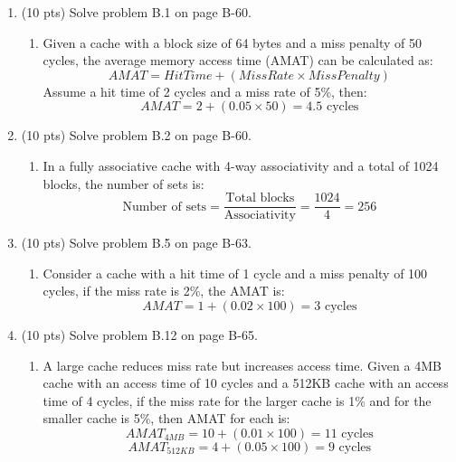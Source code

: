 \begin{enumerate}
    \item (10 pts) Solve problem B.1 on page B-60.
    \begin{enumerate}
        \item Given a cache with a block size of 64 bytes and a miss penalty of 50 cycles, the average memory access time (AMAT) can be calculated as:
        \begin{equation}
        AMAT = Hit Time + (Miss Rate \times Miss Penalty)
        \end{equation}
        Assume a hit time of 2 cycles and a miss rate of 5\%, then:
        \begin{equation}
        AMAT = 2 + (0.05 \times 50) = 4.5 \text{ cycles}
        \end{equation}
    \end{enumerate}
    
    \item (10 pts) Solve problem B.2 on page B-60.
    \begin{enumerate}
        \item In a fully associative cache with 4-way associativity and a total of 1024 blocks, the number of sets is:
        \begin{equation}
        \text{Number of sets} = \frac{\text{Total blocks}}{\text{Associativity}} = \frac{1024}{4} = 256
        \end{equation}
    \end{enumerate}
    
    \item (10 pts) Solve problem B.5 on page B-63.
    \begin{enumerate}
        \item Consider a cache with a hit time of 1 cycle and a miss penalty of 100 cycles, if the miss rate is 2\%, the AMAT is:
        \begin{equation}
        AMAT = 1 + (0.02 \times 100) = 3 \text{ cycles}
        \end{equation}
    \end{enumerate}
    
    \item (10 pts) Solve problem B.12 on page B-65.
    \begin{enumerate}
        \item A large cache reduces miss rate but increases access time. Given a 4MB cache with an access time of 10 cycles and a 512KB cache with an access time of 4 cycles, if the miss rate for the larger cache is 1\% and for the smaller cache is 5\%, then AMAT for each is:
        \begin{equation}
        AMAT_{4MB} = 10 + (0.01 \times 100) = 11 \text{ cycles}
        \end{equation}
        \begin{equation}
        AMAT_{512KB} = 4 + (0.05 \times 100) = 9 \text{ cycles}
        \end{equation}
    \end{enumerate}
    

\end{enumerate}
